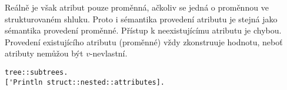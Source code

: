 Reálně je však atribut pouze proměnná, ačkoliv se jedná o proměnnou ve strukturovaném shluku.
Proto i sémantika provedení atributu je stejná jako sémantika provedení proměnné. Přístup
k neexistujícímu atributu je chybou. Provedení existujícího atributu (proměnné) vždy zkonstruuje
hodnotu, neboť atributy nemůžou být $v$-nevlastní.

\begin{lstlisting}[caption={Příklad přístupu k atributům objektu}]
tree::subtrees.
['Println struct::nested::attributes].
\end{lstlisting}

\endinput
